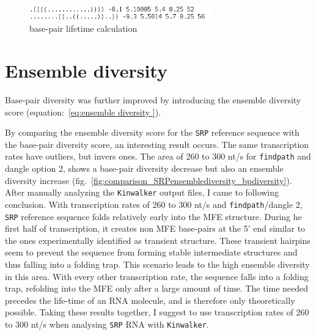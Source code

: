 \documentclass[ twoside,openright,titlepage,numbers=noenddot,headinclude,%
                footinclude=false, cleardoublepage=empty,abstractoff, %
                BCOR=5mm,paper=a4,fontsize=11pt,%
                ngerman,american,%
                ]{scrreprt}
\newcommand{\todo}[1]{{\color{green}\bfseries ** #1 **}}
\begin{document}
\begin{figure}[ht] 
\centering
\includegraphics[width=0.7\textwidth]{./pictures/TimeCalculation.png}
\caption{base-pair lifetime calculation}
\label{fig:fig_bp_lifetime_calculations}
\end{figure}		


 
\section{Ensemble diversity}
Base-pair diversity was further improved by introducing the ensemble diversity score (equation:~\ref{eq:ensemble diversity
}).

By comparing the ensemble diversity score for the \texttt{SRP} reference sequence
with the base-pair diversity score, an interesting result occurs. The same
transcription rates have outliers, but invers ones. The area of 260 to 300 nt/s
for \texttt{findpath} and dangle option 2, shows a base-pair diversity
decrease but also an ensemble diversity increase (fig.~\ref{fig:comparison_SRPensemblediversity_bpdiversity}). After
manually analyzing the \texttt{Kinwalker} output files, I came to
following conclusion. With transcription rates of 260 to 300 nt/s and
\texttt{findpath}/dangle 2, \texttt{SRP} reference sequence folds relatively early into
the MFE structure. During he first half of transcription, it creates non
MFE base-pairs at the 5' end similar to the ones experimentally identified
as transient structure. These transient hairpins seem to prevent the
sequence from forming stable intermediate structures and thus falling into a folding trap.
This scenario leads to the high ensemble
diversity in this area. With every other transcription rate, the sequence
falls into a folding trap, refolding into the MFE only after a large amount
of time. The time needed precedes the life-time of an RNA molecule, and is
therefore only theoretically possible.
Taking these results together, I suggest to use transcription rates of
260 to 300 nt/s when analysing \texttt{SRP} RNA with \texttt{Kinwalker}.
\end{document}
